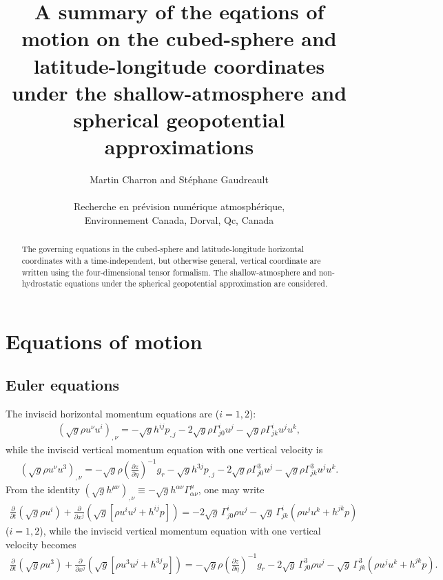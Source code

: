 \documentclass{article}
\begin{document}
\title{\bf A summary of the eqations of motion on the cubed-sphere and latitude-longitude coordinates under the shallow-atmosphere and spherical geopotential approximations}

\author{Martin Charron and St\'ephane Gaudreault \\
\\ \vspace{6pt} Recherche en pr\'evision num\'erique atmosph\'erique, 
\\ Environnement Canada, Dorval, Qc, Canada}

\maketitle

\begin{abstract}
The governing equations in the cubed-sphere and latitude-longitude horizontal coordinates with a time-independent, but otherwise general, vertical coordinate are written using the four-dimensional tensor formalism. The shallow-atmosphere and non-hydrostatic equations under the spherical geopotential approximation are considered.
\end{abstract}

\section{Equations of motion}
\subsection{Euler equations}
The inviscid horizontal momentum equations are ($i=1,2$):
\begin{align}
\left( \sqrt{g}\rho u^\nu u^i\right)_{,\nu} = - \sqrt{g}h^{ij}p_{,j} -2\sqrt{g} \rho \Gamma^i_{j0} u^j - \sqrt{g} \rho \Gamma^i_{jk}u^ju^k,
\end{align}
while the inviscid vertical momentum equation with one vertical velocity is
\begin{align}
\left( \sqrt{g}\rho u^\nu u^3\right)_{,\nu} = - \sqrt{g} \rho \left(\frac{\partial z}{\partial \eta}\right)^{-1} g_r - \sqrt{g}h^{3j}p_{,j} -2\sqrt{g} \rho \Gamma^3_{j0} u^j - \sqrt{g} \rho \Gamma^3_{jk}u^ju^k.
\end{align}
From the identity $(\sqrt{g}h^{\mu\nu})_{,\nu}\equiv -\sqrt{g}h^{\alpha\nu}\Gamma^\mu_{\alpha\nu}$, one may write
\begin{align}
\frac{\partial}{\partial t}\left( \sqrt{g}\rho u^i\right) + \frac{\partial}{\partial x^j}\left( \sqrt{g}\left[\rho u^iu^j+h^{ij}p\right]\right) = -2\sqrt{g} \, \Gamma^i_{j0} \rho u^j - \sqrt{g} \, \Gamma^i_{jk}\left(\rho u^ju^k+h^{jk}p\right)
\end{align}
($i=1,2$), while the inviscid vertical momentum equation with one vertical velocity becomes
\begin{align}
\frac{\partial}{\partial t}\left( \sqrt{g}\rho u^3\right) + \frac{\partial}{\partial x^j}\left( \sqrt{g}\left[\rho u^3 u^j + h^{3j}p\right]\right)= - \sqrt{g} \rho \left(\frac{\partial z}{\partial \eta}\right)^{-1} g_r -2\sqrt{g} \, \Gamma^3_{j0} \rho u^j - \sqrt{g} \, \Gamma^3_{jk}\left(\rho u^ju^k+h^{jk}p\right).
\end{align}
\end{document}
